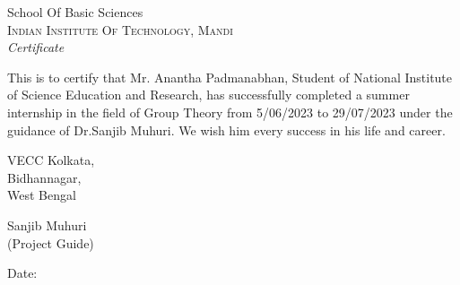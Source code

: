 \documentclass{article}
\begin{document}
\newpage
\thispagestyle{empty}

\begin{center}

\huge{School Of Basic Sciences}\\[0.5cm]
\normalsize
\textsc{Indian Institute Of Technology, Mandi}\\[2.0cm]

\emph{\LARGE Certificate}\\[1cm]
\end{center}
This is to certify that Mr. Anantha Padmanabhan, Student of 
National Institute of Science Education and Research, has 
successfully completed a summer internship in the field of 
Group Theory from 5/06/2023 to 29/07/2023 under the guidance 
of Dr.Sanjib Muhuri. We wish him every success 
in his life and career.\\
\vspace{0.5cm}
\begin{flushleft}
    VECC Kolkata,\\
    Bidhannagar,\\
    West Bengal\\
\end{flushleft}




\vfill


\begin{flushright}
Sanjib Muhuri\\
(Project Guide)\\
\end{flushright}
\begin{flushleft}
Date:
\end{flushleft}
\restoregeometry












\end{document}
